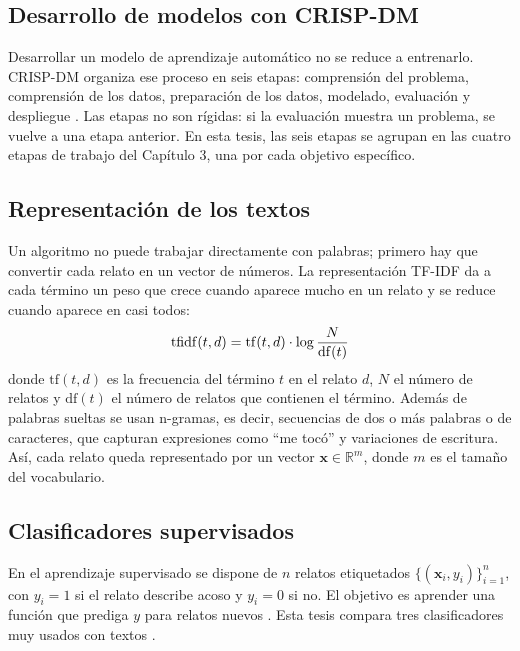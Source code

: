 \subsection{Desarrollo de modelos con CRISP-DM}
Desarrollar un modelo de aprendizaje automático no se reduce a entrenarlo. CRISP-DM organiza ese proceso en seis etapas: comprensión del problema, comprensión de los datos, preparación de los datos, modelado, evaluación y despliegue \citep{chapman2000}. Las etapas no son rígidas: si la evaluación muestra un problema, se vuelve a una etapa anterior. En esta tesis, las seis etapas se agrupan en las cuatro etapas de trabajo del Capítulo 3, una por cada objetivo específico.

\subsection{Representación de los textos}
Un algoritmo no puede trabajar directamente con palabras; primero hay que convertir cada relato en un vector de números. La representación TF-IDF da a cada término un peso que crece cuando aparece mucho en un relato y se reduce cuando aparece en casi todos:
\begin{equation}
\ecuacion{Ponderación TF-IDF de un término}
\mathrm{tfidf}(t,d) = \mathrm{tf}(t,d) \cdot \log\frac{N}{\mathrm{df}(t)}
\label{eq:tfidf}
\end{equation}
donde $\mathrm{tf}(t,d)$ es la frecuencia del término $t$ en el relato $d$, $N$ el número de relatos y $\mathrm{df}(t)$ el número de relatos que contienen el término. Además de palabras sueltas se usan n-gramas, es decir, secuencias de dos o más palabras o de caracteres, que capturan expresiones como \enquote{me tocó} y variaciones de escritura. Así, cada relato queda representado por un vector $\mathbf{x} \in \mathbb{R}^{m}$, donde $m$ es el tamaño del vocabulario.

\subsection{Clasificadores supervisados}
En el aprendizaje supervisado se dispone de $n$ relatos etiquetados $\{(\mathbf{x}_i, y_i)\}_{i=1}^{n}$, con $y_i = 1$ si el relato describe acoso y $y_i = 0$ si no. El objetivo es aprender una función que prediga $y$ para relatos nuevos \citep{hastie2009}. Esta tesis compara tres clasificadores muy usados con textos \citep{salawu2020}.

